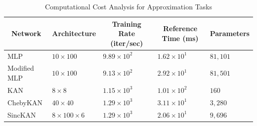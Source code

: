 \begin{table}[ht]
\caption{Computational Cost Analysis for Approximation Tasks\dag}
\label{table:cost for kans}
\begin{center}
\begin{tabular}{lllll}
\multicolumn{1}{c}{\textbf{Network}} & \multicolumn{1}{c}{\textbf{Architecture}} & \multicolumn{1}{c}{\textbf{Training Rate (iter/sec)}} & \multicolumn{1}{c}{\textbf{Reference Time (ms)}} & \multicolumn{1}{c}{\textbf{Parameters}} \\ \hline
MLP & $10\times 100$ & $9.89\times 10^2$ & $1.62\times 10^1$ & $81,101$ \\
Modified MLP & $10\times 100$ & $9.13\times 10^2$ & $2.92\times 10^1$ & $81,501$ \\
KAN & $8\times 8$ & $1.15\times 10^3$ & $1.01\times 10^2$ & $160$ \\
ChebyKAN & $40\times 40$ & $1.29\times 10^3$ & $3.11\times 10^1$ & $3,280$ \\
SincKAN & $8\times 100 \times 6$ & $1.29\times 10^3$ & $2.06\times 10^1$ & $9,696$ \\
\end{tabular}
\end{center}
\end{table}

